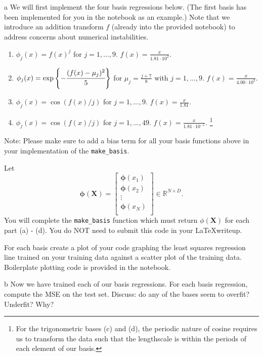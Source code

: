 \documentclass[expanded]{pset}
\begin{document}
\begin{parts}
  \begin{part}{a}
    We will first implement the four basis regressions below. (The first basis has been implemented for you in the notebook as an example.) Note that we introduce an addition transform $f$ (already into the provided notebook) to address concerns about numerical instabilities.
    \begin{enumerate}
      \item $\phi_j(x)= f(x)^j$ for $j=1,\ldots, 9$. $f(x) = \frac{x}{1.81 \cdot 10^{2}}.$
      \item $\phi_j(x) = \exp\left\{-\cfrac{(f(x)-\mu_j)^2}{5}\right\}$ for $\mu_j=\frac{j + 7}{8}$ with $j=1,\ldots, 9$. $f(x) = \frac{x}{4.00 \cdot 10^{2}}.$
      \item $\phi_j(x) =  \cos(f(x) / j)$ for $j=1, \ldots, 9$. $f(x) = \frac{x}{1.81}$.
      \item $\phi_j(x) = \cos(f(x) / j)$ for $j=1, \ldots, 49$. $f(x) = \frac{x}{1.81 \cdot 10^{-1}}$. \footnote{For the trigonometric bases (c) and (d), the periodic nature of
    cosine requires us to transform the data such that the 
    lengthscale is within the periods of each element of our basis.}
    \end{enumerate}

    {\footnotesize * Note: Please make sure to add a bias term for
    all your basis functions above in your implementation of the 
    \verb|make_basis|.}

    Let $$ \mathbf{\phi}(\mathbf{X}) = 
    \begin{bmatrix} 
    \mathbf{\phi}(x_1) \\
    \mathbf{\phi}(x_2) \\
    \vdots \\
    \mathbf{\phi}(x_N) \\
    \end{bmatrix} \in \mathbb{R}^{N\times D}.$$
    You will complete the \verb|make_basis| function which must return $\phi(\mathbf{X})$ for each part (a) - (d). You do NOT need to submit this code in your \LaTeX writeup.

    For each basis create a plot of your code graphing the least squares regression line trained on your training data against a scatter plot of the training data. Boilerplate plotting code is provided in the notebook.
  \end{part}

  \begin{part}{b}
    Now we have trained each of our basis regressions.  For each basis
    regression, compute the MSE on the test set.  Discuss: do any of the
    bases seem to overfit?  Underfit?  Why?
  \end{part}


\end{parts}
\end{document}
